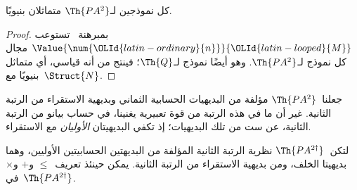 \documentclass[../../../include/open-logic-section]{subfiles}
\begin{document}
\begin{cor}
كل نموذجين لـ$\Th{PA^2}$ متماثلان بنيويًا.
\end{cor}

\begin{proof}
بمبرهنة~ تستوعب
$\Value{\num{{\OLId{latin-ordinary}{n}}}}{{\OLId{latin-looped}{M}}}$ مجال كل نموذج لـ$\Th{PA^2}$.
وهو أيضًا نموذج لـ$\Th{Q}$؛ فينتج من
 أنه قياسي، أي متماثل
بنيويًا مع~$\Struct{N}$.
\end{proof}

جعلنا~$\Th{PA^2}$ مؤلفة من البديهيات الحسابية الثماني وبديهية
الاستقراء من الرتبة الثانية. غير أن ما في هذه الرتبة من قوة تعبيرية
يغنينا، في حساب بيانو من الرتبة الثانية، عن ست من تلك البديهيات؛
إذ تكفي البديهيتان \emph{الأوليان} مع الاستقراء.

\begin{prop}
لتكن~$\Th{PA^{2\dagger}}$ نظرية الرتبة الثانية المؤلفة من
البديهتين الحسابيتين الأوليين، وهما بديهيتا الخلف، ومن بديهية
الاستقراء من الرتبة الثانية. يمكن حينئذ تعريف~$\le$ و$+$ و$\times$
في~$\Th{PA^{2\dagger}}$.
\end{prop}
\end{document}
